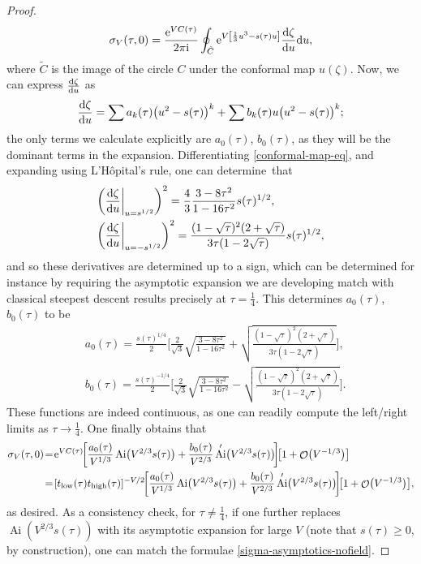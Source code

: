 \documentclass[10pt,a4paper]{amsart}
\DeclareMathOperator{\OO}{\mathcal{O}}
\DeclareMathOperator{\Ai}{Ai}
\numberwithin{equation}{section}
\begin{document}
\begin{proof}
\begin{equation*}
 \sigma_V(\tau,0) = \frac{{\rm e}^{V C(\tau)}}{2\pi {\rm i}}\oint_{\tilde{C}} {\rm e}^{V\left[\frac{1}{3} u^3 -s(\tau) u\right]} \frac{{\rm d}\zeta}{{\rm d}u} {\rm d}u,
 \end{equation*}
 where $\tilde{C}$ is the image of the circle $C$ under the conformal map $u(\zeta)$. Now, we can express $\frac{{\rm d}\zeta}{{\rm d}u}$ as
 \begin{equation*}
 \frac{{\rm d}\zeta}{{\rm d}u} = \sum a_k(\tau)\bigl(u^2-s(\tau)\bigr)^k + \sum b_k(\tau)u\bigl(u^2-s(\tau)\bigr)^k;
 \end{equation*}
 the only terms we calculate explicitly are $a_0(\tau)$, $b_0(\tau)$, as they will be the dominant terms in the expansion. Differentiating \eqref{conformal-map-eq}, and expanding using L'H\^{o}pital's rule, one can determine~that
 \begin{align*}
 &\biggl(\frac{{\rm d} \zeta}{{\rm d} u}\bigg|_{u = s^{1/2}}\biggr)^2= \frac{4}{3}\frac{3-8\tau^2}{1-16\tau^2}s(\tau)^{1/2},\\
 &\biggl(\frac{{\rm d} \zeta}{{\rm d} u}\bigg|_{u = -s^{1/2}}\biggr)^2= \frac{(1-\sqrt{\tau})^2(2+\sqrt{\tau})}{3\tau(1-2\sqrt{\tau})}s(\tau)^{1/2},
 \end{align*}
 and so these derivatives are determined up to a sign, which can be determined for instance by requiring the asymptotic expansion we are developing match with classical steepest descent results precisely at $\tau = \frac{1}{4}$. This determines $a_0(\tau)$, $b_0(\tau)$
 to be
 \begin{align*}
 &a_0(\tau)=\frac{s(\tau)^{1/4}}{2}\Biggl[\frac{2}{\sqrt{3}}\sqrt{\frac{3-8\tau^2}{1-16\tau^2}} + \sqrt{\frac{(1-\sqrt{\tau})^2(2+\sqrt{\tau})}{3\tau(1-2\sqrt{\tau})}}\Biggr],\\
 &b_0(\tau)=\frac{s(\tau)^{-1/4}}{2}\Biggl[\frac{2}{\sqrt{3}}\sqrt{\frac{3-8\tau^2}{1-16\tau^2}} - \sqrt{\frac{(1-\sqrt{\tau})^2(2+\sqrt{\tau})}{3\tau(1-2\sqrt{\tau})}}\Biggr].
 \end{align*}
 These functions are indeed continuous, as one can readily compute the left/right limits as $\tau\to\frac{1}{4}$.
 One finally obtains that
 \begin{align*}
 \sigma_V(\tau,0) &\!=\! {\rm e}^{VC(\tau)}\!\biggl[\frac{a_0(\tau)}{V^{1/3}}\Ai\bigl(V^{2/3}s(\tau)\bigr) + \frac{b_0(\tau)}{V^{2/3}}\Ai'\bigl(V^{2/3}s(\tau)\bigr)\!\biggr]\!\bigl[1 + \OO\bigl(V^{-1/3}\bigr)\bigr]\\
 &\!=\![t_{{\rm low}}(\tau)t_{{\rm high}}(\tau)]^{-V/2}\!\biggl[\frac{a_0(\tau)}{V^{1/3}}\Ai\bigl(V^{2/3}s(\tau)\bigr) + \frac{b_0(\tau)}{V^{2/3}}\Ai'\bigl(V^{2/3}s(\tau)\bigr)\!\biggr]\!\bigl[1 + \OO\bigl(V^{-1/3}\bigr)\bigr],
 \end{align*}
 as desired. As a consistency check, for $\tau\neq \frac{1}{4}$, if one further replaces $\Ai(V^{2/3}s(\tau))$ with its asymptotic expansion for large $V$ (note that $s(\tau) \geq 0$, by construction), one can match the formulae \eqref{sigma-asymptotics-nofield}.
\end{proof}
\end{document}
